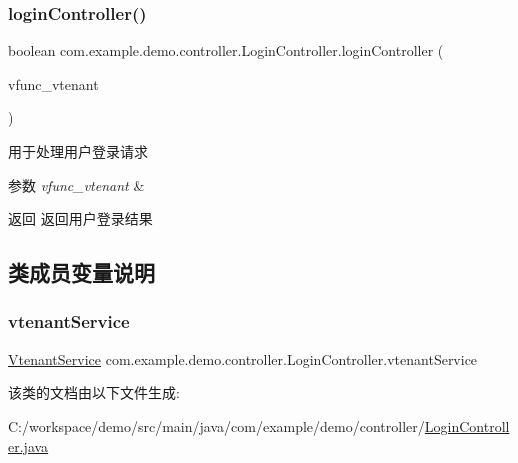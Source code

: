 \subsubsection{\texorpdfstring{login\+Controller()}{loginController()}}
{\footnotesize\ttfamily boolean com.\+example.\+demo.\+controller.\+Login\+Controller.\+login\+Controller (\begin{DoxyParamCaption}\item[{@Request\+Body String}]{vfunc\+\_\+vtenant }\end{DoxyParamCaption})}

用于处理用户登录请求 
\begin{DoxyParams}{参数}
{\em vfunc\+\_\+vtenant} & \\
\hline
\end{DoxyParams}
\begin{DoxyReturn}{返回}
返回用户登录结果 
\end{DoxyReturn}


\subsection{类成员变量说明}
\mbox{\label{classcom_1_1example_1_1demo_1_1controller_1_1_login_controller_a8b4e3860cf4b4d59ea68634cfd6f1d33}} 
\subsubsection{\texorpdfstring{vtenant\+Service}{vtenantService}}
{\footnotesize\ttfamily \mbox{\hyperlink{classcom_1_1example_1_1demo_1_1service_1_1_vtenant_service}{Vtenant\+Service}} com.\+example.\+demo.\+controller.\+Login\+Controller.\+vtenant\+Service\hspace{0.3cm}{\ttfamily [package]}}



该类的文档由以下文件生成\+:\begin{DoxyCompactItemize}
\item 
C\+:/workspace/demo/src/main/java/com/example/demo/controller/\mbox{\hyperlink{_login_controller_8java}{Login\+Controller.\+java}}\end{DoxyCompactItemize}
